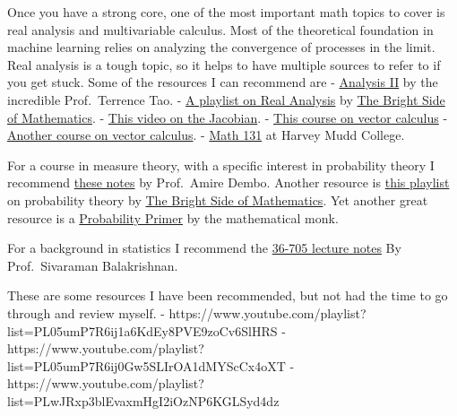 Once you have a strong core, one of the most important math topics to
cover is real analysis and multivariable calculus. Most of the
theoretical foundation in machine learning relies on analyzing the
convergence of processes in the limit. Real analysis is a tough topic,
so it helps to have multiple sources to refer to if you get stuck. Some
of the resources I can recommend are -
\href{https://amazon.com/Analysis-II-Third-Readings-Mathematics/dp/9380250657}{Analysis
II} by the incredible Prof.~Terrence Tao. -
\href{https://www.youtube.com/playlist?list=PLBh2i93oe2quABbNq4I_-hyjhW8eOdgrO}{A
playlist on Real Analysis} by
\href{https://www.youtube.com/c/brightsideofmaths}{The Bright Side of
Mathematics}. - \href{https://www.youtube.com/watch?v=wCZ1VEmVjVo}{This
video on the Jacobian}. -
\href{https://www.youtube.com/playlist?list=PLSQl0a2vh4HC5feHa6Rc5c0wbRTx56nF7}{This
course on vector calculus} -
\href{https://www.youtube.com/playlist?list=PLHXZ9OQGMqxc_CvEy7xBKRQr6I214QJcd}{Another
course on vector calculus}. -
\href{https://www.youtube.com/playlist?list=PL04BA7A9EB907EDAF}{Math
131} at Harvey Mudd College.

For a course in measure theory, with a specific interest in probability
theory I recommend
\href{https://statweb.stanford.edu/~adembo/stat-310b/lnotes.PLE7DDD91010BC51F8}{these
notes} by Prof.~Amire Dembo. Another resource is
\href{https://www.youtube.com/playlist?list=PLBh2i93oe2qswFOC98oSFc37-0f4S3D4z}{this
playlist} on probability theory by
\href{https://www.youtube.com/c/brightsideofmaths}{The Bright Side of
Mathematics}. Yet another great resource is a
\href{https://www.youtube.com/playlist?list=PL17567A1A3F5DB5E4}{Probability
Primer} by the mathematical monk.

For a background in statistics I recommend the
\href{http://stat.cmu.edu/~siva/705/main.html}{36-705 lecture notes} By
Prof.~Sivaraman Balakrishnan.

These are some resources I have been recommended, but not had the time
to go through and review myself. -
https://www.youtube.com/playlist?list=PL05umP7R6ij1a6KdEy8PVE9zoCv6SlHRS
-
https://www.youtube.com/playlist?list=PL05umP7R6ij0Gw5SLIrOA1dMYScCx4oXT
-
https://www.youtube.com/playlist?list=PLwJRxp3blEvaxmHgI2iOzNP6KGLSyd4dz
